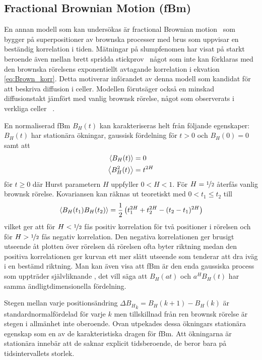 \subsection{Fractional Brownian Motion (fBm)}

En annan modell som kan undersökas är fractional Brownian motion~\cite{Mandelbrot_fBm1968} som bygger på superpositioner av brownska processer med brus som uppvisar en beständig korrelation i tiden. Mätningar på slumpfenomen har visat på starkt beroende även mellan brett spridda stickprov~\cite{Mandelbrot_fBm1968} något som inte kan förklaras med den brownska rörelsens exponentiellt avtagande korrelation i ekvation \eqref{eq:Brown_korr}. Detta motiverar införandet av denna modell som kandidat för att beskriva   diffusion i celler. Modellen förutsäger också en minskad diffusionstakt jämfört med vanlig brownsk rörelse, något som observerats i verkliga celler ~\cite{Hofling&Franosch2013}.

En normaliserad fBm $B_H(t)$ kan karakteriseras helt från följande egenskaper\cite{Dieker_fBm}: $B_H(t)$ har stationära ökningar, gaussisk fördelning för $t>0$ och $B_H(0)=0$ samt att
\begin{align}
    \ev{B_H(t)}&=0 \\
    \ev{B^2_H(t)}&=t^{2H}
\end{align}
för $t\geq 0$ där Hurst parametern $H$ uppfyller $0< H <1$. För $H=\nicefrac{1}{2}$ återfås vanlig brownsk rörelse. Kovariansen kan räknas ut teoretiskt med $0<
t_1\leq t_2$ till
\begin{equation}
\ev{B_H(t_1)B_H(t_2)}
= \frac{1}{2} \left(t_1^{2H}+t_2^{2H}-(t_2-t_1)^{2H}\right)
\end{equation}
vilket ger att för $H<\nicefrac{1}{2}$ fås positiv korrelation för två positioner i rörelsen och för  $H>\nicefrac{1}{2}$ fås negativ korrelation. Den negativa korrelationen ger brusigt utseende åt plotten över rörelsen då rörelsen ofta byter riktning medan den positiva korrelationen ger kurvan ett mer slätt utseende som tenderar att dra iväg i en bestämd riktning. Man kan även visa att fBm är den enda gaussiska process som uppträder självliknande \cite{}, det vill säga att $B_H(at)$ och $a^H B_H(t)$ har samma ändligtdimensionella fördelning.

Stegen mellan varje positionsändring $\Delta{B_H}_k=B_H(k+1)-B_H(k)$ är standardnormalfördelad för varje $k$ men tillskillnad från ren brownsk rörelse är stegen i allmänhet inte oberoende. Ovan utpekades dessa ökningars stationära egenskap som en av de karakteristiska dragen för fBm. Att ökningarna är stationära innebär att de saknar explicit tidsberoende, de beror bara på tidsintervallets storlek.

